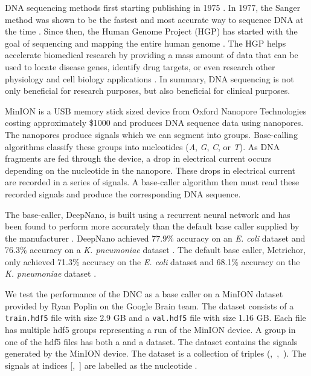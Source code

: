 DNA sequencing methods first starting publishing in 1975 \cite{SANGER1975441}.
In 1977, the Sanger method was shown to be the fastest and most accurate
way to sequence DNA at the time \cite{sanger1977dna}. Since then, the
Human Genome Project (HGP) has started with the goal of sequencing and mapping
the entire human genome \cite{international2001initial}. The HGP helps
accelerate biomedical research by providing a mass amount of data
that can be used to locate disease genes, identify drug targets, or even
research other physiology and cell biology applications
\cite{international2001initial}. In summary, DNA sequencing is not only
beneficial for research purposes, but also beneficial for clinical purposes.

MinION is a USB memory stick sized device from Oxford Nanopore Technologies
costing approximately \$1000 and produces DNA sequence data using nanopores.
The nanopores produce signals which we can segment into groups. Base-calling
algorithms classify these groups into nucleotides (\textit{A}, \textit{G},
\textit{C}, or \textit{T}). As DNA fragments are fed through the device,
a drop in electrical current occurs depending on the nucleotide in the
nanopore. These drops in electrical current are recorded in a series of
signals. A base-caller algorithm then must read these recorded signals and
produce the corresponding DNA sequence.

The base-caller, DeepNano, is built using a recurrent neural network and has
been found to perform more accurately than the default base caller supplied
by the manufacturer \cite{bovza2017deepnano}. DeepNano achieved 77.9\% accuracy
on an \textit{E. coli} dataset and 76.3\% accuracy on a \textit{K. pneumoniae}
dataset \cite{bovza2017deepnano}. The default base caller, Metrichor, only
achieved 71.3\% accuracy on the \textit{E. coli} dataset and 68.1\% accuracy on
the \textit{K. pneumoniae} dataset \cite{bovza2017deepnano}.

We test the performance of the DNC as a base caller on a MinION dataset
provided by Ryan Poplin on the Google Brain team. The dataset consists of a
\texttt{train.hdf5} file with size 2.9 GB and a \texttt{val.hdf5} file with
size 1.16 GB. Each file has multiple hdf5 groups representing a run of the
MinION device. A group in one of the hdf5 files has both a  and a
 dataset. The  dataset contains the signals
generated by the MinION device. The  dataset is a collection
of triples \mbox{(, , )}.
The signals at indices \mbox{[, ]} are
labelled as the nucleotide .

